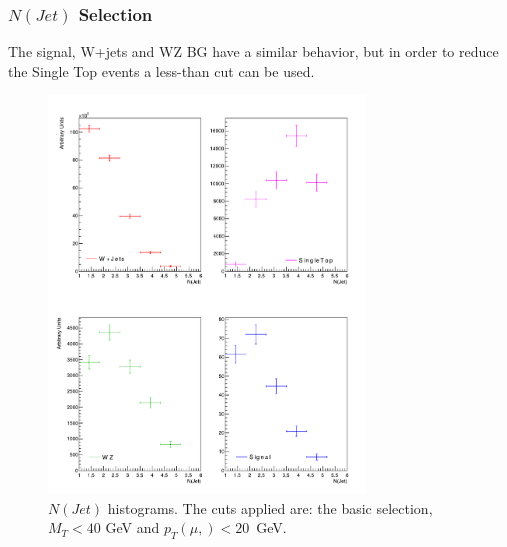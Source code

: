 \documentclass{beamer}
\begin{document}
\begin{frame}
\frametitle{$N(Jet)$ Selection}
\begin{justify}
	{\scriptsize The signal, W+jets and WZ BG have a similar behavior, but in order to reduce the Single Top events a less-than cut can be used.}
\end{justify}

\begin{figure}[!h]
	
	\centering
	\includegraphics[width=0.75\textwidth, height=0.65\textheight]{pictures/Selection/NJet/All-NJet}
	\caption{{\scriptsize $N(Jet)$ histograms. The cuts applied are: the basic selection, $M_T<40$ GeV and $p_T(\mu,)<20$~GeV.}}
	\label{All-NJet}
	
\end{figure}


\end{frame}

\end{document}
